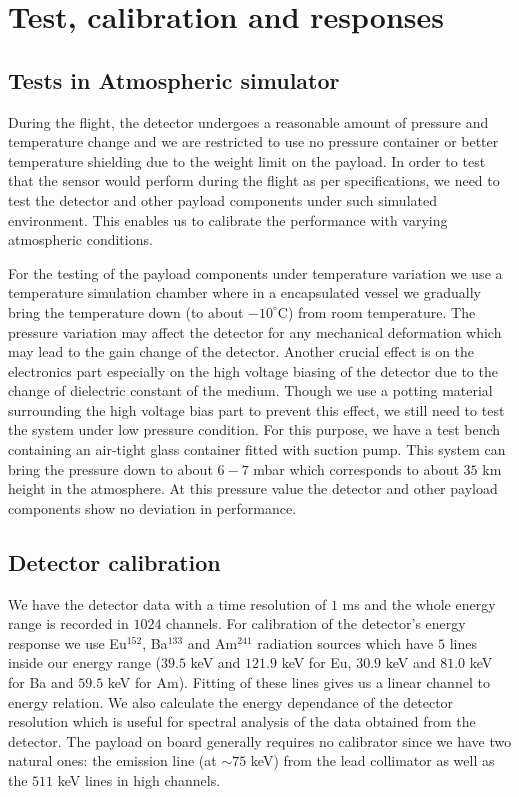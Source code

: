 \section{Test, calibration and responses}
\label{sec:calib}

\subsection{Tests in Atmospheric simulator}
\label{ssec:test}
During the flight, the detector undergoes a reasonable amount of pressure
and temperature change and we are restricted to use no pressure container or
better temperature shielding due to the weight limit on the payload. In order to 
test that the sensor would perform during the flight as per specifications, we need to 
test the detector and other payload components under such simulated environment. This 
enables us to calibrate the performance with varying atmospheric conditions.

For the testing of the payload components under temperature variation we use a
temperature simulation chamber where in a encapsulated vessel we gradually bring
the temperature down (to about $-10^{\circ}$C) from room temperature.
The pressure variation may affect the detector for any mechanical deformation
which may lead to the gain change of the detector. Another crucial effect is on
the electronics part especially on the high voltage biasing of the detector due
to the change of dielectric constant of the medium. Though we use a potting
material surrounding the high voltage bias part to prevent this effect, we
still need to test the system under low pressure condition. For this purpose, we
have a test bench containing an air-tight glass container fitted with suction
pump. This system can bring the pressure down to about $6-7$ mbar which
corresponds to about $35$ km height in the atmosphere. At this pressure value the
detector and other payload components show no deviation in performance.

\subsection{Detector calibration}
\label{ssec:detcal}
We have the detector data with a time resolution of $1$ ms and the whole energy
range is recorded in $1024$ channels. For calibration of the detector's energy 
response we use Eu$^{152}$, Ba$^{133}$ and Am$^{241}$ radiation 
sources which have $5$ lines inside our
energy range ($39.5$ keV and $121.9$ keV for Eu, $30.9$ keV and $81.0$ keV for Ba
and $59.5$ keV for Am). Fitting of these lines gives us a linear channel to 
energy relation. We also
calculate the energy dependance of the detector resolution which is useful for
spectral analysis of the data obtained from the detector. The payload on board
generally requires no calibrator since we have two natural ones: 
the emission line (at $\sim 75$ keV) from the lead collimator as well as the $511$ keV lines in high channels. 


